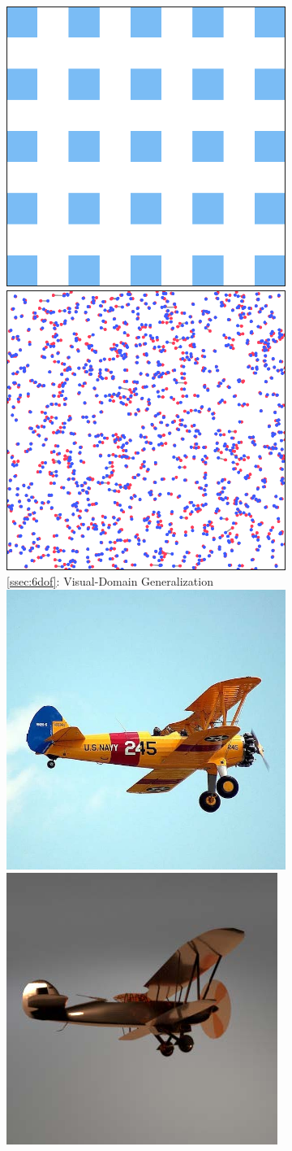\begin{figure}
\begin{subfigure}{0.325\textwidth}
\vspace{0.025cm}
\includegraphics[width=0.400\linewidth]{figures/2d/sparse_checkerboard.pdf}
\hspace{0.025cm}
\raisebox{0.4in}{$\Rightarrow$}
\hspace{0.025cm}
\includegraphics[width=0.400\linewidth]{figures/2d/float_scatter.pdf}\\
\cref{ssec:6dof}: Visual-Domain Generalization\\
\vspace{0.025cm}
\includegraphics[width=0.400\linewidth]{figures/airplane/6dof/input/teaser.jpg}
\hspace{0.025cm}
\raisebox{0.4in}{$\Rightarrow$}
\hspace{0.025cm}
\includegraphics[width=0.400\linewidth]{figures/airplane/6dof/output/teaser.jpg}

\end{subfigure}
\end{figure}
